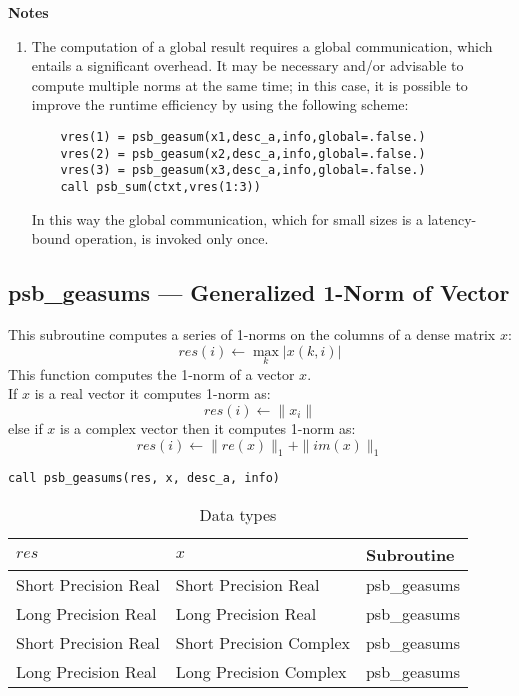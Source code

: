 {\par\noindent\large\bfseries Notes}
\begin{enumerate}
\item The computation of a global result requires a global
  communication, which entails a significant overhead. It may be
  necessary and/or advisable to compute multiple norms at the same 
  time; in this case, it is possible to improve the runtime efficiency
  by using the following scheme:
  \begin{lstlisting}
    vres(1) = psb_geasum(x1,desc_a,info,global=.false.)
    vres(2) = psb_geasum(x2,desc_a,info,global=.false.)
    vres(3) = psb_geasum(x3,desc_a,info,global=.false.)
    call psb_sum(ctxt,vres(1:3))
  \end{lstlisting}
  In this way the global communication, which for small sizes is a
  latency-bound operation, is invoked only once.
\end{enumerate}


\clearpage\subsection{psb\_geasums --- Generalized 1-Norm of Vector}

This subroutine computes a series of  1-norms on the columns of
a  dense matrix  $x$: 
\[ res(i) \leftarrow \max_k |x(k,i)| \]
This function computes the 1-norm of a vector $x$.\\
If $x$ is a real vector 
it computes 1-norm as:
\[ res(i) \leftarrow  \|x_i\|\]
else if $x$ is a complex vector then it computes 1-norm  as:
\[ res(i) \leftarrow \|re(x)\|_1 + \|im(x)\|_1\]


\begin{verbatim}
call psb_geasums(res, x, desc_a, info)
\end{verbatim}

\begin{table}[h]
\begin{center}
\begin{tabular}{lll}
\hline
$res$ & $x$ & {\bf Subroutine}\\
\hline
Short Precision Real&Short Precision Real & psb\_geasums \\
Long Precision Real&Long Precision Real & psb\_geasums \\
Short Precision Real&Short Precision Complex & psb\_geasums \\
Long Precision Real&Long Precision Complex & psb\_geasums \\
\hline
\end{tabular}
\end{center}
\caption{Data types\label{tab:f90asums}}
\end{table}

